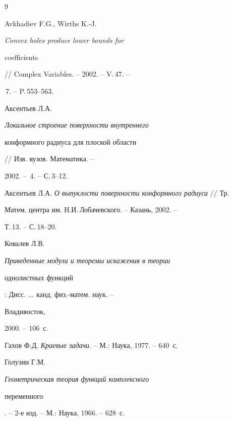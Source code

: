 \begin{thebibliography}{9} 


 




Avkhadiev F.G., Wirths K.-J. {\em Convex holes produce lower bounds for 


coefficients} // Complex Variables. -- 2002. -- V.\,47. -- 


\No\,7. -- P.\,553--563. 




Аксентьев Л.А. {\em Локальное строение поверхности внутреннего 


конформного радиуса для плоской области} // Изв. вузов. Математика. -- 


2002. -- \No\,4. -- С.\,3--12. 




Аксентьев Л.А. {\em О выпуклости поверхности конформного радиуса} // Тр. 


Матем. центра им. Н.И.\,Лобачевского. -- Казань, 2002. -- 


Т.\,13. -- С.\,18--20. 




Ковалев Л.В. {\em Приведенные модули и теоремы искажения в теории 


однолистных функций}: Дисс. $\dotsc$ канд. физ.-матем. наук. -- 


Владивосток, 


2000. -- 106~с. 




Гахов Ф.Д. {\em Краевые задачи}. -- М.: Наука, 1977. -- 640~с. 




Голузин Г.М. {\em Геометрическая теория функций комплексного 


переменного}. -- 2-е изд. -- М.: Наука, 1966. -- 628~с. 


 


\end{thebibliography} 


 


\vskip 0.5cm 


 






 


\label{end} 


 


 


